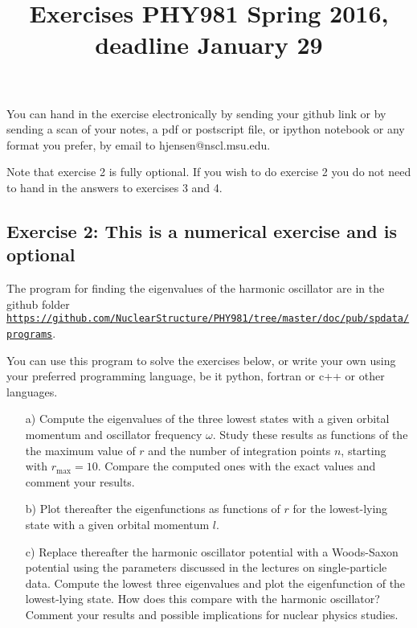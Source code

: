 \documentclass[prc]{revtex4}
\begin{document}
\title{Exercises PHY981 Spring 2016, deadline January 29}
\maketitle
You can hand in the exercise  electronically by sending your github link or by sending a scan of your notes, a pdf or postscript file, or ipython notebook or any format you prefer,  by email to 
hjensen@nscl.msu.edu. 

Note that exercise 2 is fully optional. If you wish to do exercise 2 you do not need to hand in the answers to exercises 3 and 4. 

\subsection*{Exercise 2: This is a numerical exercise and is optional}


The program for finding the eigenvalues of the harmonic oscillator are in the github folder
\href{{https://github.com/NuclearStructure/PHY981/tree/master/doc/pub/spdata/programs}}{\nolinkurl{https://github.com/NuclearStructure/PHY981/tree/master/doc/pub/spdata/programs}}.

You can use this program to solve the exercises below, or write your own using your preferred programming language, be it python, fortran or c++ or other languages. 
\begin{enumerate}
\item[a)] Compute the eigenvalues of the three lowest states with a given orbital momentum and oscillator frequency $\omega$. Study these results as functions of the the maximum value of $r$ and the number of integration points $n$, starting with  $r_{\mathrm{max}}=10$. Compare the computed ones with the exact values and comment your results.

\item[b)]  Plot thereafter the eigenfunctions as functions of $r$ for the lowest-lying state with a given orbital momentum $l$.

\item[c)]  Replace thereafter the harmonic oscillator potential with a Woods-Saxon potential using the parameters discussed in the lectures on single-particle data. Compute the lowest three eigenvalues and plot the eigenfunction of the lowest-lying state. How does this compare with the harmonic oscillator? Comment your results and possible implications for nuclear physics studies.
\end{enumerate}
\end{document}
